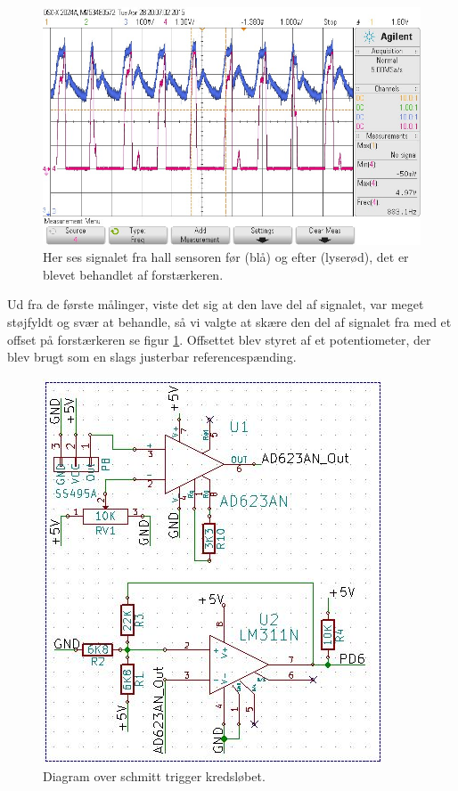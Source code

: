 \begin{figure}[h]

	\centering
		\includegraphics[scale=0.4]{Billeder/Signal1.jpg}
	\caption{Her ses signalet fra hall sensoren før (blå) og efter (lyserød), det er blevet behandlet af forstærkeren.}
	\label{fig:Signal1}
	
\end{figure}

Ud fra de første målinger, viste det sig at den lave del af signalet, var meget støjfyldt og svær at behandle, så vi valgte at skære den del af signalet fra med et offset på forstærkeren se figur \ref{fig:Signal1}. Offsettet blev styret af et potentiometer, der blev brugt som en slags justerbar referencespænding.

\begin{figure}[h]

	\centering
		\includegraphics[scale=0.3]{Billeder/Schmitt.jpg}
	\caption{Diagram over schmitt trigger kredsløbet.}
	\label{fig:Schmitt}
	
\end{figure}


